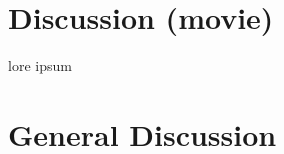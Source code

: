 \documentclass[english]{article}
\begin{document}


\section{Discussion (movie)}
lore ipsum

\section*{General Discussion}
\end{document}
